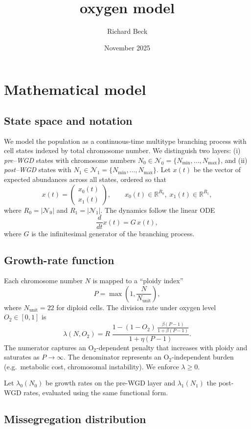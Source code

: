 \documentclass{article}
\title{oxygen model}
\author{Richard Beck}
\date{November 2025}
\begin{document}
\section*{Mathematical model}

\subsection*{State space and notation}

We model the population as a continuous-time multitype branching process with
cell states indexed by total chromosome number.
We distinguish two layers:
(i) \emph{pre–WGD} states with chromosome numbers $N_0 \in \mathcal{N}_0 = \{N_{\min},\dots,N_{\max}\}$,
and (ii) \emph{post–WGD} states with $N_1 \in \mathcal{N}_1 = \{N_{\min},\dots,N_{\max}\}$.
Let $x(t)$ be the vector of expected abundances across all states, ordered
so that
\[
x(t)
= 
\begin{pmatrix}
x_0(t) \\ x_1(t)
\end{pmatrix},
\qquad 
x_0(t) \in \mathbb{R}^{R_0},\;
x_1(t) \in \mathbb{R}^{R_1},
\]
where $R_0 = |\mathcal{N}_0|$ and $R_1 = |\mathcal{N}_1|$.
The dynamics follow the linear ODE
\[
\frac{d}{dt} x(t)
= 
G \, x(t),
\]
where $G$ is the infinitesimal generator of the branching process.

\subsection*{Growth-rate function}

Each chromosome number $N$ is mapped to a ``ploidy index''
\[
P = \max\!\left(1, \frac{N}{N_{\mathrm{unit}}}\right),
\]
where $N_{\mathrm{unit}}=22$ for diploid cells.
The division rate under oxygen level $O_2\in[0,1]$ is
\[
\lambda(N,O_2)
=
R \;
\frac{
1 - (1-O_2)\,
\displaystyle\frac{\beta(P-1)}{1+\beta(P-1)}
}{
1 + \eta (P-1)
}.
\]
The numerator captures an O$_2$-dependent penalty that increases with ploidy
and saturates as $P\to\infty$.
The denominator represents an O$_2$-independent burden (e.g.\ metabolic cost,
chromosomal instability).
We enforce $\lambda\ge 0$.

Let $\lambda_0(N_0)$ be growth rates on the pre-WGD layer and
$\lambda_1(N_1)$ the post-WGD rates, evaluated using the same functional form.

\subsection*{Missegregation distribution}
\end{document}
